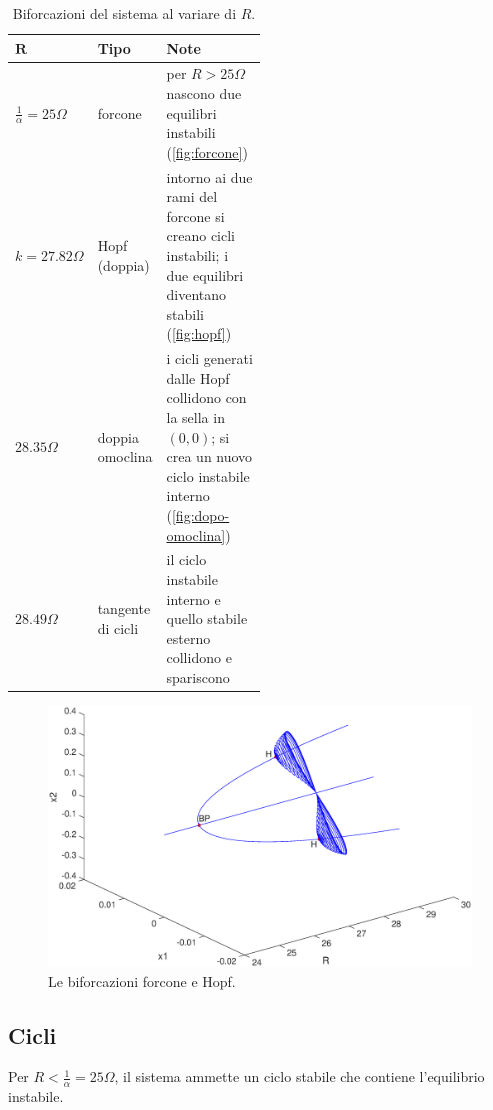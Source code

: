 \begin{enumerate}
\begin{table}
    \centering
    \begin{tabular}{l l p{0.5\linewidth}}
        $\mathbf{R}$ & \textbf{Tipo} & \textbf{Note}\\
        \hline
        $\frac{1}{\alpha} = 25 \Omega$ & forcone & per $R>25 \Omega$ nascono due equilibri instabili (\autoref{fig:forcone}) \\
        \hline
        $k=27.82 \Omega$ & Hopf (doppia) & intorno ai due rami del forcone si creano cicli instabili; i due equilibri diventano stabili (\autoref{fig:hopf}) \\
        \hline
        $28.35 \Omega$ & doppia omoclina & i cicli generati dalle Hopf collidono con la sella in $(0,0)$; si crea un nuovo ciclo instabile interno (\autoref{fig:dopo-omoclina}) \\
        \hline
        $28.49 \Omega$ & tangente di cicli & il ciclo instabile interno e quello stabile esterno collidono e spariscono \\
        \hline
    \end{tabular}
    \caption{Biforcazioni del sistema al variare di $R$.}
    \label{tab:biforc-r}
\end{table}

\begin{figure}
    \centering
    \includegraphics[width=1.1\textwidth]{matcont/ForconeHopf}
    \caption{Le biforcazioni forcone e Hopf.}
    \label{fig:forcone}
\end{figure}

\subsection{Cicli}
Per $R<\frac{1}{\alpha}=25 \Omega$, il sistema ammette un ciclo stabile che contiene l'equilibrio instabile.


\end{enumerate}
